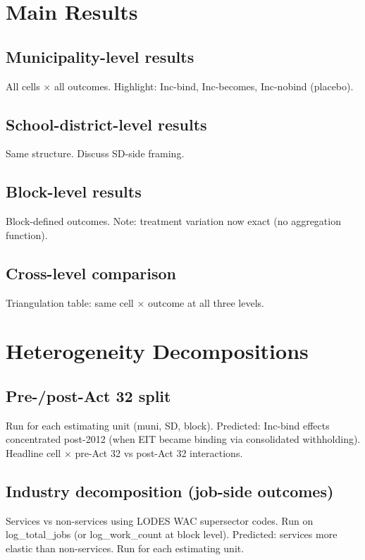 \documentclass{article}
\begin{document}
\section{Main Results}

\subsection{Municipality-level results}
All cells $\times$ all outcomes. Highlight: Inc-bind, Inc-becomes,
Inc-nobind (placebo).

\subsection{School-district-level results}
Same structure. Discuss SD-side framing.

\subsection{Block-level results}
Block-defined outcomes. Note: treatment variation now exact (no
aggregation function).

\subsection{Cross-level comparison}
Triangulation table: same cell $\times$ outcome at all three levels.

\section{Heterogeneity Decompositions}

\subsection{Pre-/post-Act 32 split}
Run for each estimating unit (muni, SD, block). Predicted: Inc-bind
effects concentrated post-2012 (when EIT became binding via
consolidated withholding). Headline cell $\times$ pre-Act 32 vs
post-Act 32 interactions.

\subsection{Industry decomposition (job-side outcomes)}
Services vs non-services using LODES WAC supersector codes. Run on
log\_total\_jobs (or log\_work\_count at block level). Predicted:
services more elastic than non-services. Run for each estimating unit.
\end{document}
